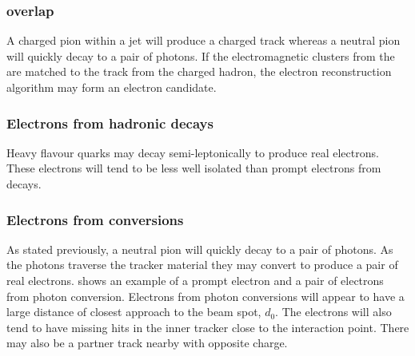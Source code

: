 \subsubsection{\HepProcess{\Ppipm \Ppizero} overlap}
A charged pion within a jet will produce a charged track whereas a neutral pion
will quickly decay to a pair of photons. If the electromagnetic clusters from
the \Ppizero are matched to the track from the charged hadron, the electron
reconstruction algorithm may form an electron candidate\cite{nikos}.

\subsubsection{Electrons from hadronic decays}
Heavy flavour quarks may decay semi-leptonically to produce real electrons. These
electrons will tend to be less well isolated than prompt electrons from \PW
decays\cite{nikos}.

\subsubsection{Electrons from conversions}
As stated previously, a neutral pion will quickly decay to a pair of photons. As
the photons traverse the tracker material they may convert to produce a pair of
real electrons\cite{nikos,barge2009conversion}.  
shows an example of a prompt electron and a pair of electrons from photon
conversion.  Electrons from photon conversions will appear to have a large
distance of closest approach to the beam spot, $d_0$.  The electrons will also
tend to have missing hits in the inner tracker close to the interaction point.
There may also be a partner track nearby with opposite charge.

